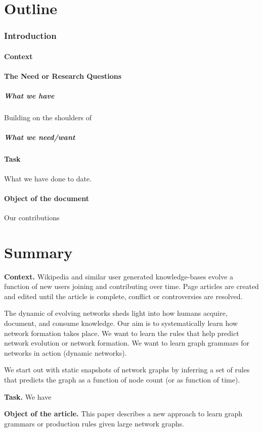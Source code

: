 
\part{Outline}
\section{Introduction}

\subsection{Context}
\subsection{The Need or Research Questions}
\subsubsection{What we have}
Building on the shoulders of
\subsubsection{What we need/want }
\subsection{Task}
What we have done to date.
\subsection{Object of the document}
Our contributions
\part{Summary}


\textbf{Context. }
Wikipedia and similar user generated knowledge-bases evolve a function of new
users joining and contributing over time.  Page articles are created and edited
until the article is complete, conflict or controversies are resolved.

The dynamic of evolving networks sheds light into how humans acquire,
document, and consume knowledge. Our aim is to systematically learn how network
formation takes place.  We want to learn the rules that help predict network
evolution or network formation.  We want to learn graph grammars for networks
in action (dynamic networks).

We start out with static snapshots of network graphs by inferring a set of
rules that predicts the graph as a function of node count (or as function of time).

\textbf{Task. } We have 

\textbf{Object of the article. } This paper describes a new approach to learn
graph grammars or production rules given large network graphs.
